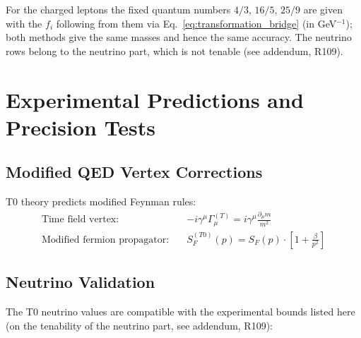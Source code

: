 	For the charged leptons the fixed quantum numbers $4/3$, $16/5$, $25/9$ are given with the $f_i$ following from them via Eq.~\ref{eq:transformation_bridge} (in GeV$^{-1}$); both methods give the same masses and hence the same accuracy. The neutrino rows belong to the neutrino part, which is not tenable (see addendum, R109).
	
	\section{Experimental Predictions and Precision Tests}
	\label{sec:experimental_predictions}
	
	\subsection{Modified QED Vertex Corrections}
	\label{subsec:qed_corrections}
	
	T0 theory predicts modified Feynman rules:
	\begin{align}
		\text{Time field vertex:} \quad &-i\gamma^\mu\Gamma_\mu^{(T)} = i\gamma^\mu\frac{\partial_\mu m}{m^2} \\
		\text{Modified fermion propagator:} \quad &S_F^{(T0)}(p) = S_F(p) \cdot \left[1 + \frac{\beta}{p^2}\right]
	\end{align}
	
	\subsection{Neutrino Validation}
	\label{subsec:neutrino_validation}
	
	The T0 neutrino values are compatible with the experimental bounds listed here (on the tenability of the neutrino part, see addendum, R109):
	
	\begin{table}[H]
		\centering
		\caption{T0 neutrino predictions vs. experimental constraints}
		\label{tab:neutrino_validation}
	\end{table}
	
